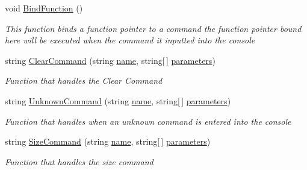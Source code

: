 \begin{DoxyCompactItemize}
\item 
void \hyperlink{class_c_p_u___o_s___simulator_1_1_console_1_1_console_command_af8141f5684792a07c6581fb032155e56}{Bind\+Function} ()
\begin{DoxyCompactList}\small\item\em This function binds a function pointer to a command the function pointer bound here will be executed when the command it inputted into the console \end{DoxyCompactList}\item 
string \hyperlink{class_c_p_u___o_s___simulator_1_1_console_1_1_console_command_acd9c603dea4eebeb095c6e05fe97a91e}{Clear\+Command} (string \hyperlink{class_c_p_u___o_s___simulator_1_1_console_1_1_console_command_a0ba819d58268ef4f9bab12089a9fd1a4}{name}, string\mbox{[}$\,$\mbox{]} \hyperlink{class_c_p_u___o_s___simulator_1_1_console_1_1_console_command_a00586d96461c740fd20069c604424c22}{parameters})
\begin{DoxyCompactList}\small\item\em Function that handles the Clear Command \end{DoxyCompactList}\item 
string \hyperlink{class_c_p_u___o_s___simulator_1_1_console_1_1_console_command_adb3909a3be152976476805bdf3b7d291}{Unknown\+Command} (string \hyperlink{class_c_p_u___o_s___simulator_1_1_console_1_1_console_command_a0ba819d58268ef4f9bab12089a9fd1a4}{name}, string\mbox{[}$\,$\mbox{]} \hyperlink{class_c_p_u___o_s___simulator_1_1_console_1_1_console_command_a00586d96461c740fd20069c604424c22}{parameters})
\begin{DoxyCompactList}\small\item\em Function that handles when an unknown command is entered into the console \end{DoxyCompactList}\item 
string \hyperlink{class_c_p_u___o_s___simulator_1_1_console_1_1_console_command_a5767cc6343b192fe16e5e98aec2292e2}{Size\+Command} (string \hyperlink{class_c_p_u___o_s___simulator_1_1_console_1_1_console_command_a0ba819d58268ef4f9bab12089a9fd1a4}{name}, string\mbox{[}$\,$\mbox{]} \hyperlink{class_c_p_u___o_s___simulator_1_1_console_1_1_console_command_a00586d96461c740fd20069c604424c22}{parameters})
\begin{DoxyCompactList}\small\item\em Function that handles the size command \end{DoxyCompactList}\item 

\end{DoxyCompactItemize}

